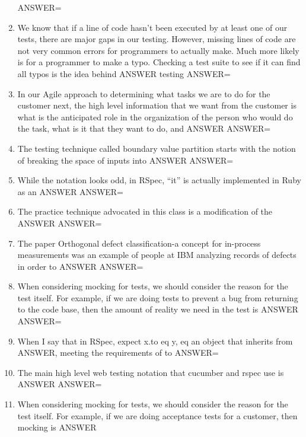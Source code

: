 \documentclass{exam}
\begin{document}
\begin{enumerate}
ANSWER=
\item We know that if a line of code hasn't been executed by at least one of our tests, there are major gaps in our testing.  However, missing lines of code are not very common errors for programmers to actually make.  Much more likely is for a programmer to make a typo.  Checking a test suite to see if it can find all typos is the idea behind ANSWER testing\newline
ANSWER=
\item In our Agile approach to determining what tasks we are to do for the customer next, the high level information that we want from the customer is what is the anticipated role in the organization of the person who would do the task, what is it that they want to do, and ANSWER\newline
ANSWER=
\item The testing technique called boundary value partition starts with the notion of breaking the space of inputs into ANSWER\newline
ANSWER=
\item While the notation looks odd, in RSpec, ``it'' is actually implemented in Ruby as an ANSWER\newline
ANSWER=
\item The practice technique advocated in this class is a modification of the ANSWER\newline
ANSWER=
\item The paper Orthogonal defect classification-a concept for in-process measurements was an example of people at IBM analyzing records of defects in order to ANSWER\newline
ANSWER=
\item When considering mocking for tests, we should consider the reason for the test itself.  For example, if we are doing tests to prevent a bug from returning to the code base, then the amount of reality we need in the test is ANSWER\newline
ANSWER=
\item When I say that in RSpec, expect x.to eq y, eq an object that inherits from ANSWER, meeting the requirements of to\newline
ANSWER=
\item The main high level web testing notation that cucumber and rspec use is ANSWER\newline
ANSWER=
\item When considering mocking for tests, we should consider the reason for the test itself.  For example, if we are doing acceptance tests for a customer, then mocking is ANSWER\newline

\end{enumerate}
\end{document}
